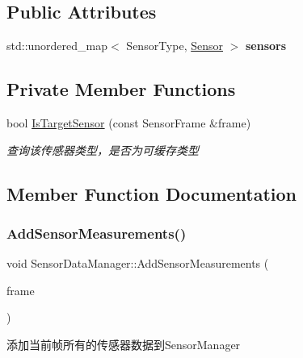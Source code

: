 \subsection*{Public Attributes}
\begin{DoxyCompactItemize}
\item 
\mbox{\label{classSensorDataManager_a89bfa8160e9b4e8a8e510d1ca121229d}} 
std\+::unordered\+\_\+map$<$ Sensor\+Type, \hyperlink{classSensor}{Sensor} $>$ {\bfseries sensors}
\end{DoxyCompactItemize}
\subsection*{Private Member Functions}
\begin{DoxyCompactItemize}
\item 
bool \hyperlink{classSensorDataManager_a90a06eeb7f654dcf4b8e2bc6cad34c39}{Is\+Target\+Sensor} (const Sensor\+Frame \&frame)
\begin{DoxyCompactList}\small\item\em 查询该传感器类型，是否为可缓存类型 \end{DoxyCompactList}\end{DoxyCompactItemize}


\subsection{Member Function Documentation}
\mbox{\label{classSensorDataManager_aa77c1102b15426f743e63277af2731c2}} 
\subsubsection{\texorpdfstring{Add\+Sensor\+Measurements()}{AddSensorMeasurements()}}
{\footnotesize\ttfamily void Sensor\+Data\+Manager\+::\+Add\+Sensor\+Measurements (\begin{DoxyParamCaption}\item[{const Sensor\+Frame \&}]{frame }\end{DoxyParamCaption})}



添加当前帧所有的传感器数据到\+Sensor\+Manager 


